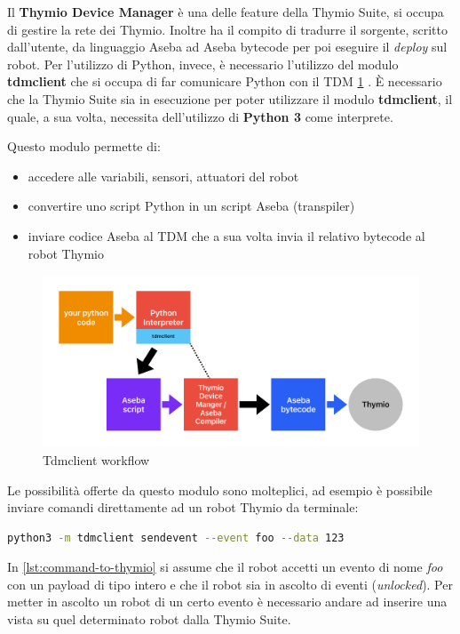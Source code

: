 \documentclass[12pt,a4paper,openright,twoside]{book}
\begin{document}
Il \textbf{Thymio Device Manager} è una delle feature della Thymio Suite, si occupa di gestire la rete dei Thymio. Inoltre ha il compito di tradurre il sorgente, scritto dall'utente, da linguaggio Aseba ad Aseba bytecode per poi eseguire il \textit{deploy} sul robot. Per l'utilizzo di Python, invece, è necessario l'utilizzo del modulo \textbf{tdmclient} che si occupa di far comunicare Python con il \ac{TDM} \cref{fig:tdmclient} \cite{pypiTdmclient}. È necessario che la Thymio Suite sia in esecuzione per poter utilizzare il modulo \textbf{tdmclient}, il quale, a sua volta, necessita dell'utilizzo di \textbf{Python 3} come interprete.

Questo modulo permette di:
\begin{itemize}
    \item accedere alle variabili, sensori, attuatori del robot
    \item convertire uno script Python in un script Aseba (transpiler)
    \item inviare codice Aseba al \ac{TDM} che a sua volta invia il relativo bytecode al  robot Thymio 
\end{itemize}

\begin{figure}
    \centering
    \includegraphics[width=.8\linewidth]{figures/TDM.pdf}
    \caption{Tdmclient workflow}
    \label{fig:tdmclient}
\end{figure}

Le possibilità offerte da questo modulo sono molteplici, ad esempio è possibile inviare comandi direttamente ad un robot Thymio da terminale:

\begin{lstlisting}[language=Bash, label={lst:command-to-thymio}, caption={Esempio di invio di comando (foo) ad un robot Thymio}]
    python3 -m tdmclient sendevent --event foo --data 123
\end{lstlisting}

In \cref{lst:command-to-thymio} si assume che il robot accetti un evento di nome \textit{foo} con un payload di tipo intero e che il robot sia in ascolto di eventi (\textit{unlocked}). Per metter in ascolto un robot di un certo evento è necessario andare ad inserire una vista su quel determinato robot dalla Thymio Suite.
\end{document}
